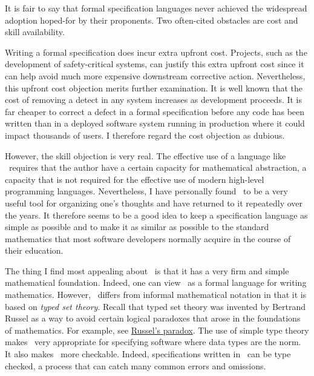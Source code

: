 \documentclass{amsart}
\begin{document}
It is fair to say that formal specification languages never achieved the widespread adoption hoped-for by their proponents.
Two often-cited obstacles are cost and skill availability.

Writing a formal specification does incur extra upfront cost.
Projects, such as the development of safety-critical systems, can justify this extra upfront cost since it can help
avoid much more expensive downstream corrective action.
Nevertheless, this upfront cost objection merits further examination.
It is well known that the cost of removing a detect in any system increases as development proceeds.
It is far cheaper to correct a defect in a formal specification before any code has been written
than in a deployed software system running in production
where it could impact thousands of users.
I therefore regard the cost objection as dubious.

However, the skill objection is very real.
The effective use of a language like \ZN\ requires that the author have a certain capacity for mathematical abstraction,
a capacity that is not required for the effective use of modern high-level programming languages.
Nevertheless, I have personally found \ZN\ to be a very useful tool for organizing one's thoughts
and have returned to it repeatedly over the years.
It therefore seems to be a good idea to keep a specification language as simple as possible and to make it as
similar as possible to the standard mathematics that most software developers normally acquire in the course of their education.

The thing I find most appealing about \ZN\ is that it has a very firm and simple mathematical foundation.
Indeed, one can view \ZN\ as a formal language for writing mathematics. 
However, \ZN\ differs from informal mathematical notation in that it is based on \textit{typed set theory}.
Recall that typed set theory was invented by Bertrand Russel as a way to avoid certain logical paradoxes
that arose in the foundations of mathematics.
For example, see \href{https://en.wikipedia.org/wiki/Russell's_paradox}{Russel's paradox}.
The use of simple type theory makes \ZN\ very appropriate for specifying software where data types are the norm.
It also makes \ZN\ more checkable. Indeed, specifications written in \ZN\ can be type checked, a process
that can catch many common errors and omissions.
\end{document}
